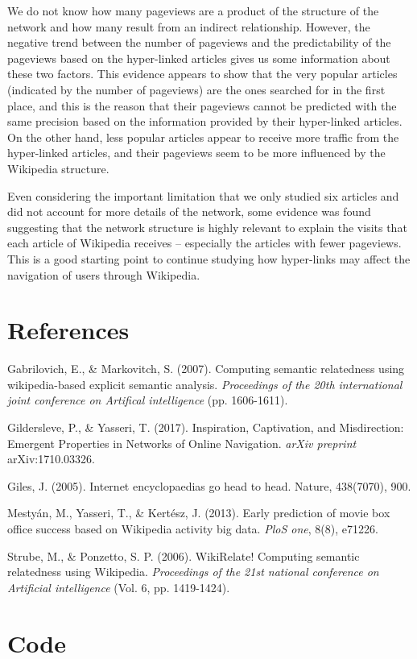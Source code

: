 \documentclass[11pt]{article}
\begin{document}
We do not know how many pageviews are a product of the structure of the network and how many result from an indirect relationship. However, the negative trend between the number of pageviews and the predictability of the pageviews based on the hyper-linked articles gives us some information about these two factors. This evidence appears to show that the very popular articles (indicated by the number of pageviews) are the ones searched for in the first place, and this is the reason that their pageviews cannot be predicted with the same precision based on the information provided by their hyper-linked articles. On the other hand, less popular articles appear to receive more traffic from the hyper-linked articles, and their pageviews seem to be more influenced by the Wikipedia structure.

Even considering the important limitation that we only studied six articles and did not account for more details of the network, some evidence was found suggesting that the network structure is highly relevant to explain the visits that each article of Wikipedia receives -- especially the articles with fewer pageviews. This is a good starting point to continue studying how hyper-links may affect the navigation of users through Wikipedia. 



\section{References}

\begin{hangparas}{.5in}{1}

Gabrilovich, E., \& Markovitch, S. (2007). Computing semantic relatedness using wikipedia-based explicit semantic analysis. \textit{Proceedings of the 20th international joint conference on Artifical intelligence} (pp. 1606-1611).

Gildersleve, P., \& Yasseri, T. (2017). Inspiration, Captivation, and Misdirection: Emergent Properties in Networks of Online Navigation. \textit{arXiv preprint} arXiv:1710.03326.

Giles, J. (2005). Internet encyclopaedias go head to head. Nature, 438(7070), 900.

Mestyán, M., Yasseri, T., \& Kertész, J. (2013). Early prediction of movie box office success based on Wikipedia activity big data. \textit{PloS one}, 8(8), e71226.

Strube, M., \& Ponzetto, S. P. (2006). WikiRelate! Computing semantic relatedness using Wikipedia. \textit{Proceedings of the 21st national conference on Artificial intelligence} (Vol. 6, pp. 1419-1424).

\end{hangparas}

\section{Code}
\end{document}
